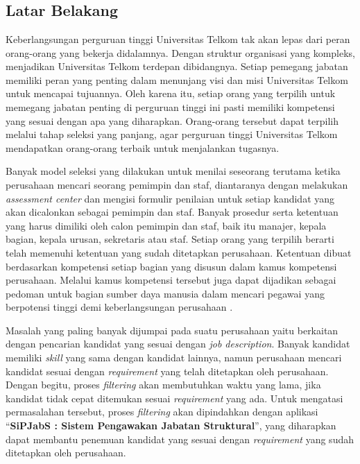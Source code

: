 \chapter{\babSatu}
\section{Latar Belakang}
Keberlangsungan perguruan tinggi Universitas Telkom tak akan lepas dari peran orang-orang yang bekerja didalamnya. Dengan struktur organisasi yang kompleks, menjadikan Universitas Telkom terdepan dibidangnya. Setiap pemegang jabatan memiliki peran yang penting dalam menunjang visi dan misi Universitas Telkom untuk mencapai tujuannya. Oleh karena itu, setiap orang yang terpilih untuk memegang jabatan penting di perguruan tinggi ini pasti memiliki kompetensi yang sesuai dengan apa yang diharapkan. Orang-orang tersebut dapat terpilih melalui tahap seleksi yang panjang, agar perguruan tinggi Universitas Telkom mendapatkan orang-orang terbaik untuk menjalankan tugasnya.

Banyak model seleksi yang dilakukan untuk menilai seseorang terutama ketika perusahaan mencari seorang pemimpin dan staf, diantaranya dengan melakukan \textit{assessment center} dan mengisi formulir penilaian untuk setiap kandidat yang akan dicalonkan sebagai pemimpin dan staf. Banyak prosedur serta ketentuan yang harus dimiliki oleh calon pemimpin dan staf, baik itu manajer, kepala bagian, kepala urusan, sekretaris atau staf. Setiap orang yang terpilih berarti telah memenuhi ketentuan yang sudah ditetapkan perusahaan. Ketentuan dibuat berdasarkan kompetensi setiap bagian yang disusun dalam kamus kompetensi perusahaan. Melalui kamus kompetensi tersebut juga dapat dijadikan sebagai pedoman untuk bagian sumber daya manusia dalam mencari pegawai yang berpotensi tinggi demi keberlangsungan perusahaan \cite{nicho}.

Masalah yang paling banyak dijumpai pada suatu perusahaan yaitu berkaitan dengan pencarian kandidat yang sesuai dengan \textit{job description}. Banyak kandidat memiliki \textit{skill} yang sama dengan kandidat lainnya, namun perusahaan mencari kandidat sesuai dengan \textit{requirement} yang telah ditetapkan oleh perusahaan. Dengan begitu, proses \textit{filtering} akan membutuhkan waktu yang lama, jika kandidat tidak cepat ditemukan sesuai \textit{requirement} yang ada. Untuk mengatasi permasalahan tersebut, proses \textit{filtering} akan dipindahkan dengan aplikasi “\textbf{SiPJabS : Sistem Pengawakan Jabatan Struktural}”, yang diharapkan dapat membantu penemuan kandidat yang sesuai dengan \textit{requirement} yang sudah ditetapkan oleh perusahaan.
\\

